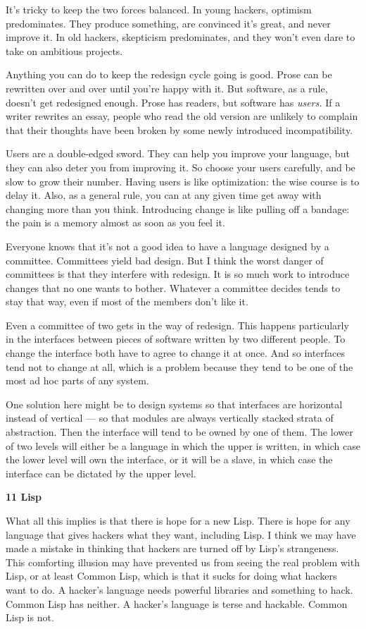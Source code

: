 It's tricky to keep the two forces balanced. In young hackers, optimism
predominates. They produce something, are convinced it's great, and
never improve it. In old hackers, skepticism predominates, and they
won't even dare to take on ambitious projects.

Anything you can do to keep the redesign cycle going is good. Prose can
be rewritten over and over until you're happy with it. But software, as
a rule, doesn't get redesigned enough. Prose has readers, but software
has \emph{users.} If a writer rewrites an essay, people who read the old
version are unlikely to complain that their thoughts have been broken by
some newly introduced incompatibility.

Users are a double-edged sword. They can help you improve your language,
but they can also deter you from improving it. So choose your users
carefully, and be slow to grow their number. Having users is like
optimization: the wise course is to delay it. Also, as a general rule,
you can at any given time get away with changing more than you think.
Introducing change is like pulling off a bandage: the pain is a memory
almost as soon as you feel it.

Everyone knows that it's not a good idea to have a language designed by
a committee. Committees yield bad design. But I think the worst danger
of committees is that they interfere with redesign. It is so much work
to introduce changes that no one wants to bother. Whatever a committee
decides tends to stay that way, even if most of the members don't like
it.

Even a committee of two gets in the way of redesign. This happens
particularly in the interfaces between pieces of software written by two
different people. To change the interface both have to agree to change
it at once. And so interfaces tend not to change at all, which is a
problem because they tend to be one of the most ad hoc parts of any
system.

One solution here might be to design systems so that interfaces are
horizontal instead of vertical --- so that modules are always vertically
stacked strata of abstraction. Then the interface will tend to be owned
by one of them. The lower of two levels will either be a language in
which the upper is written, in which case the lower level will own the
interface, or it will be a slave, in which case the interface can be
dictated by the upper level.

\textbf{11 Lisp}

What all this implies is that there is hope for a new Lisp. There is
hope for any language that gives hackers what they want, including Lisp.
I think we may have made a mistake in thinking that hackers are turned
off by Lisp's strangeness. This comforting illusion may have prevented
us from seeing the real problem with Lisp, or at least Common Lisp,
which is that it sucks for doing what hackers want to do. A hacker's
language needs powerful libraries and something to hack. Common Lisp has
neither. A hacker's language is terse and hackable. Common Lisp is not.

